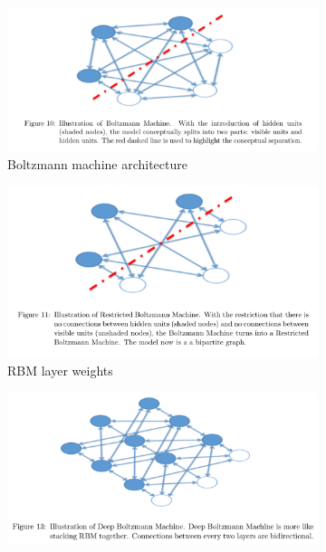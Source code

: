 \documentclass{article}
\begin{document}
\begin{figure}[h!]
\begin{subfigure}[b]{.49\textwidth}
  \centering
  \includegraphics[width=\linewidth]{lab4/bmgraph.pdf}
  \caption{Boltzmann machine architecture}
  \label{fig:bm}
\end{subfigure}
\hfill
\begin{subfigure}[b]{.49\textwidth}
  \centering
  \includegraphics[width=\linewidth]{lab4/rbmgraph.pdf}
  \caption{RBM layer weights}
  \label{fig:rbm}
\end{subfigure}
\begin{subfigure}[b]{.49\textwidth}
  \centering
  \includegraphics[width=\linewidth]{lab4/dbmgraph.pdf}

\end{subfigure}
\end{figure}
\end{document}
